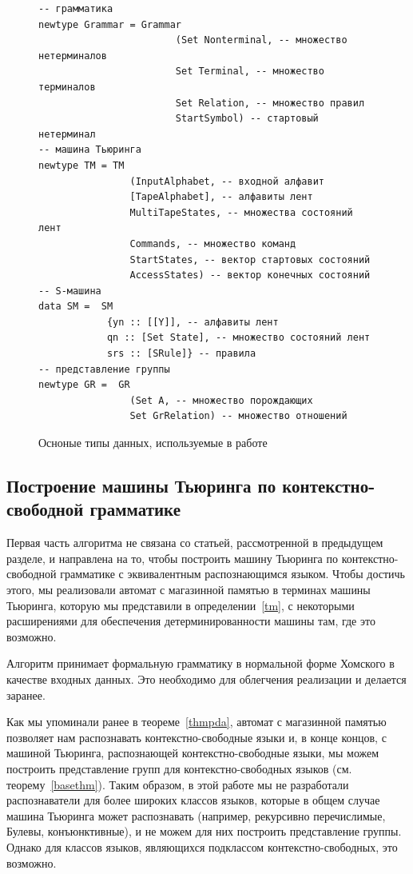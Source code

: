 \documentclass[14pt]{matmex-diploma-custom}
\begin{document}
\begin{figure}[H]
\begin{verbatim}
-- грамматика
newtype Grammar = Grammar 
                        (Set Nonterminal, -- множество нетерминалов
                        Set Terminal, -- множество терминалов
                        Set Relation, -- множество правил
                        StartSymbol) -- стартовый нетерминал
-- машина Тьюринга                        
newtype TM = TM 
                (InputAlphabet, -- входной алфавит
                [TapeAlphabet], -- алфавиты лент
                MultiTapeStates, -- множества состояний лент
                Commands, -- множество команд
                StartStates, -- вектор стартовых состояний
                AccessStates) -- вектор конечных состояний
-- S-машина                
data SM =  SM 
            {yn :: [[Y]], -- алфавиты лент
            qn :: [Set State], -- множество состояний лент
            srs :: [SRule]} -- правила
-- представление группы        
newtype GR =  GR 
                (Set A, -- множество порождающих
                Set GrRelation) -- множество отношений
\end{verbatim}
\caption{Осноные типы данных, используемые в работе}
\label{fig:types}
\end{figure}

\subsection{Построение машины Тьюринга по контекстно-свободной грамматике}
Первая часть алгоритма не связана со статьей, рассмотренной в предыдущем разделе, 
и направлена на то, чтобы построить машину Тьюринга по контекстно-свободной грамматике 
с эквивалентным распознающимся языком.
Чтобы достичь этого, мы реализовали автомат с магазинной памятью в терминах машины Тьюринга, 
которую мы представили в определении~\ref{tm}, с некоторыми 
расширениями для обеспечения детерминированности машины там, где это возможно.

Алгоритм принимает формальную грамматику в нормальной форме Хомского в качестве входных данных.
Это необходимо для облегчения реализации и делается заранее.

Как мы упоминали ранее в теореме~\ref{thmpda}, автомат с магазинной памятью позволяет нам распознавать контекстно-свободные языки и, в конце концов, с машиной Тьюринга, распознающей контекстно-свободные языки, мы можем построить представление групп для контекстно-свободных языков
(см. теорему~\ref{basethm}). 
Таким образом, в этой работе мы не разработали распознаватели для более 
широких классов языков, которые в общем случае машина Тьюринга может распознавать 
(например, рекурсивно перечислимые, Булевы, конъюнктивные), и не можем для них 
построить представление группы. Однако для классов языков, являющихся подклассом 
контекстно-свободных, это возможно. 
\end{document}
